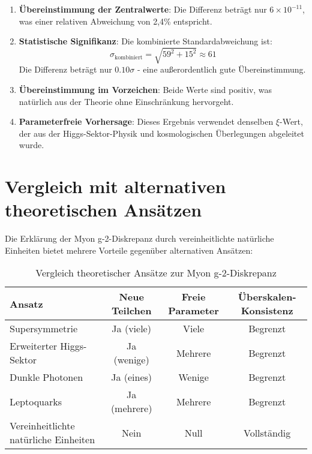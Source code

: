 \documentclass[12pt,a4paper]{article}
\newcommand{\xipar}{\xi}
\begin{document}
	\begin{enumerate}
		\item \textbf{Übereinstimmung der Zentralwerte}: Die Differenz beträgt nur $6 \times 10^{-11}$, was einer relativen Abweichung von 2,4\% entspricht.
		
		\item \textbf{Statistische Signifikanz}: Die kombinierte Standardabweichung ist:
		\begin{equation}
			\sigma_{\text{kombiniert}} = \sqrt{59^2 + 15^2} \approx 61
		\end{equation}
		Die Differenz beträgt nur $0.10\sigma$ - eine außerordentlich gute Übereinstimmung.
		
		\item \textbf{Übereinstimmung im Vorzeichen}: Beide Werte sind positiv, was natürlich aus der Theorie ohne Einschränkung hervorgeht.
		
		\item \textbf{Parameterfreie Vorhersage}: Dieses Ergebnis verwendet denselben $\xipar$-Wert, der aus der Higgs-Sektor-Physik und kosmologischen Überlegungen abgeleitet wurde.
	\end{enumerate}
	
	\section{Vergleich mit alternativen theoretischen Ansätzen}
	
	Die Erklärung der Myon g-2-Diskrepanz durch vereinheitlichte natürliche Einheiten bietet mehrere Vorteile gegenüber alternativen Ansätzen:
	
	\begin{table}[htbp]
		\centering
		\begin{tabular}{|l|c|c|c|}
			\hline
			\textbf{Ansatz} & \textbf{Neue Teilchen} & \textbf{Freie Parameter} & \textbf{Überskalen-Konsistenz} \\
			\hline
			Supersymmetrie & Ja (viele) & Viele & Begrenzt \\
			Erweiterter Higgs-Sektor & Ja (wenige) & Mehrere & Begrenzt \\
			Dunkle Photonen & Ja (eines) & Wenige & Begrenzt \\
			Leptoquarks & Ja (mehrere) & Mehrere & Begrenzt \\
			Vereinheitlichte natürliche Einheiten & Nein & Null & Vollständig \\
			\hline
		\end{tabular}
		\caption{Vergleich theoretischer Ansätze zur Myon g-2-Diskrepanz}
	\end{table}
	
\end{document}
